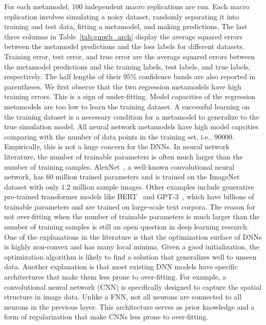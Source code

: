 For each metamodel, \num{100} independent macro replications are run.
Each macro replication involves simulating a noisy dataset, randomly separating it into training and test data, fitting a metamodel, and making predictions.
The last three columns in Table~\ref{tab:gmwb_arch} display the average squared errors between the metamodel predictions and the loss labels for different datasets.
Training error, test error, and true error are the average squared errors between the metamodel predictions and the training labels, test labels, and true labels, respectively.
The half lengths of their $95\%$ confidence bands are also reported in parentheses.
We first observe that the two regression metamodels have high training errors.
This is a sign of under-fitting.
Model capacities of the regression metamodels are too low to learn the training dataset.
A successful learning on the training dataset is a necessary condition for a metamodel to generalize to the true simulation model.
All neural network metamodels have high model capcities comparing with the number of data points in the training set, i.e., $\num{90000}$.
Empirically, this is not a huge concern for the DNNs.
In neural network literature, the number of trainable parameters is often much larger than the number of training samples.
AlexNet~\citep{krizhevsky2012imagenet}, a well-known convolutional neural network, has $\num{60}$ million trained parameters and is trained on the ImageNet dataset with only $1.2$ million sample images.
Other examples include generative pre-trained transformer models like BERT~\citep{devlin2018bert} and GPT-3~\citep{brown2020language}, which have billions of trainable parameters and are trained on large-scale text corpora.
The reason for not over-fitting when the number of trainable parameters is much larger than the number of training samples is still an open question in deep learning research.
One of the explanations in the literature is that the optimization surface of DNNs is highly non-convex and has many local minima.
Given a good initialization, the optimization algorithm is likely to find a solution that generalizes well to unseen data.
Another explanation is that most existing DNN models have specific architectures that make them less prone to over-fitting.
For example, a convolutional neural network (CNN) is specifically designed to capture the spatial structure in image data.
Unlike a FNN, not all neurons are connected to all neurons in the previous layer.
This architecture serves as prior knowledge and a form of regularization that make CNNs less prone to over-fitting.

